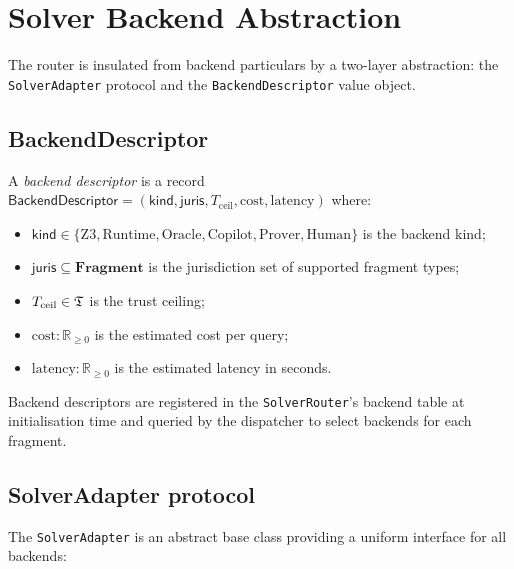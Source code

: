 \documentclass[11pt]{article}
\newcommand{\BKind}{\mathsf{kind}}        %
\newcommand{\BJuris}{\mathsf{juris}}      %
\newcommand{\BackDesc}{\mathsf{BackendDescriptor}}
\begin{document}
\section{Solver Backend Abstraction}\label{sec:backends}

The router is insulated from backend particulars by a two-layer
abstraction: the \texttt{SolverAdapter} protocol and the
\texttt{BackendDescriptor} value object.

\subsection{BackendDescriptor}\label{sec:backend-desc}

\begin{definition}\label{def:backend-desc}
A \emph{backend descriptor} is a record
$\BackDesc = (\BKind, \BJuris, T_{\mathrm{ceil}}, \mathrm{cost}, \mathrm{latency})$
where:
\begin{itemize}
  \item $\BKind \in \{\text{Z3}, \text{Runtime}, \text{Oracle},
    \text{Copilot}, \text{Prover}, \text{Human}\}$ is the backend kind;
  \item $\BJuris \subseteq \mathbf{Fragment}$ is the jurisdiction set
    of supported fragment types;
  \item $T_{\mathrm{ceil}} \in \mathfrak{T}$ is the trust ceiling;
  \item $\mathrm{cost} : \mathbb{R}_{\geq 0}$ is the estimated cost per
    query;
  \item $\mathrm{latency} : \mathbb{R}_{\geq 0}$ is the estimated
    latency in seconds.
\end{itemize}
\end{definition}

Backend descriptors are registered in the \texttt{SolverRouter}'s
backend table at initialisation time and queried by the dispatcher to
select backends for each fragment.

\subsection{SolverAdapter protocol}\label{sec:solver-adapter}

The \texttt{SolverAdapter} is an abstract base class providing a
uniform interface for all backends:
\end{document}
